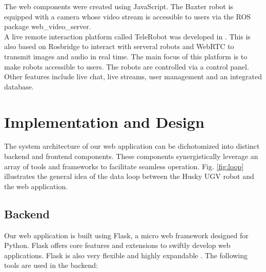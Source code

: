 \documentclass[conference]{IEEEtran}
\begin{document}
The web components were created using JavaScript. The Baxter robot is equipped with a camera whose video stream is accessible to users via the ROS package web\_video\_server.\\
A live remote interaction platform called TeleRobot was developed in \cite{wang}. This is also based on Rosbridge to interact with serveral robots and WebRTC to transmit images and audio in real time. The main focus of this platform is to make robots accessible to users. The robots are controlled via a control panel. Other features include live chat, live streams, user management and an integrated database.

\section{Implementation and Design}
The system architecture of our web application can be dichotomized into distinct backend and frontend components. These components synergistically leverage an array of tools and frameworks to facilitate seamless operation.
Fig. \ref{fig:loop} illustrates the general idea of the data loop between the Husky UGV robot and the web application.

\subsection{Backend}
Our web application is built using Flask, a micro web framework designed for Python.
Flask offers core features and extensions to swiftly develop web applications. Flask is also very flexible and highly expandable \cite{flasksqlite}. The following tools are used in the backend:
\end{document}
